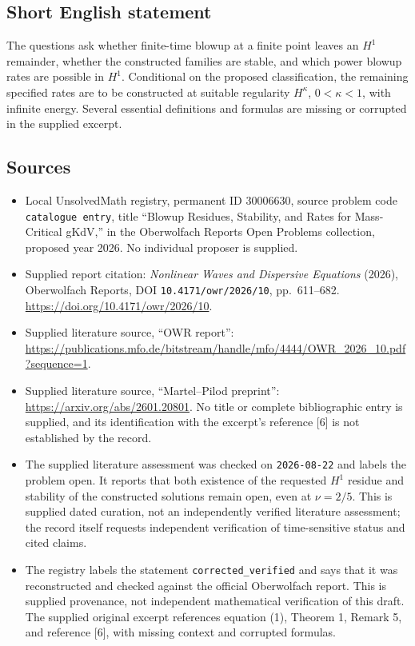 \documentclass[11pt]{article}
\begin{document}
\subsection{Short English statement}
The questions ask whether finite-time blowup at a finite point leaves an \(H^1\) remainder, whether the constructed families are stable, and which power blowup rates are possible in \(H^1\). Conditional on the proposed classification, the remaining specified rates are to be constructed at suitable regularity \(H^\kappa\), \(0<\kappa<1\), with infinite energy. Several essential definitions and formulas are missing or corrupted in the supplied excerpt.
\subsection{Sources}
\begin{itemize}
\item Local UnsolvedMath registry, permanent ID \(30006630\), source problem code \texttt{catalogue entry}, title ``Blowup Residues, Stability, and Rates for Mass-Critical gKdV,'' in the Oberwolfach Reports Open Problems collection, proposed year 2026. No individual proposer is supplied.
\item Supplied report citation: \emph{Nonlinear Waves and Dispersive Equations} (2026), Oberwolfach Reports, DOI \texttt{10.4171/owr/2026/10}, pp.\ 611--682. \url{https://doi.org/10.4171/owr/2026/10}.
\item Supplied literature source, ``OWR report'': \url{https://publications.mfo.de/bitstream/handle/mfo/4444/OWR_2026_10.pdf?sequence=1}.
\item Supplied literature source, ``Martel--Pilod preprint'': \url{https://arxiv.org/abs/2601.20801}. No title or complete bibliographic entry is supplied, and its identification with the excerpt's reference [6] is not established by the record.
\item The supplied literature assessment was checked on \texttt{2026-08-22} and labels the problem open. It reports that both existence of the requested \(H^1\) residue and stability of the constructed solutions remain open, even at \(\nu=2/5\). This is supplied dated curation, not an independently verified literature assessment; the record itself requests independent verification of time-sensitive status and cited claims.
\item The registry labels the statement \texttt{corrected\_verified} and says that it was reconstructed and checked against the official Oberwolfach report. This is supplied provenance, not independent mathematical verification of this draft. The supplied original excerpt references equation (1), Theorem 1, Remark 5, and reference [6], with missing context and corrupted formulas.
\end{itemize}
\end{document}

